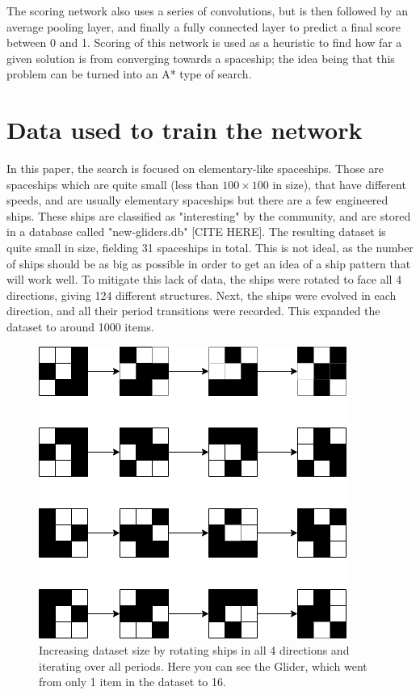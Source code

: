 \documentclass{l4proj}
\begin{document}
The scoring network also uses a series of convolutions, but is then followed by an average pooling layer, and finally a fully connected layer to predict a final score between 0 and 1. Scoring of this network is used as a heuristic to find how far a given solution is from converging towards a spaceship; the idea being that this problem can be turned into an A* type of search.

\section{Data used to train the network}

In this paper, the search is focused on elementary-like spaceships. Those are spaceships which are quite small (less than $100 \times 100$ in size), that have different speeds, and are usually elementary spaceships but there are a few engineered ships. These ships are classified as "interesting" by the community, and are stored in a database called "new-gliders.db" [CITE HERE]. The resulting dataset is quite small in size, fielding 31 spaceships in total. This is not ideal, as the number of ships should be as big as possible in order to get an idea of a ship pattern that will work well. To mitigate this lack of data, the ships were rotated to face all 4 directions, giving 124 different structures. Next, the ships were evolved in each direction, and all their period transitions were recorded. This expanded the dataset to around 1000 items.

\begin{figure}[h]
\centering
\includegraphics[width=\textwidth]{dissertation/images/diagrams/increasing_ship_data.png} 
\caption{Increasing dataset size by rotating ships in all 4 directions and iterating over all periods. Here you can see the Glider, which went from only 1 item in the dataset to 16.}
\label{fig:subim1}
\end{figure}
\end{document}
